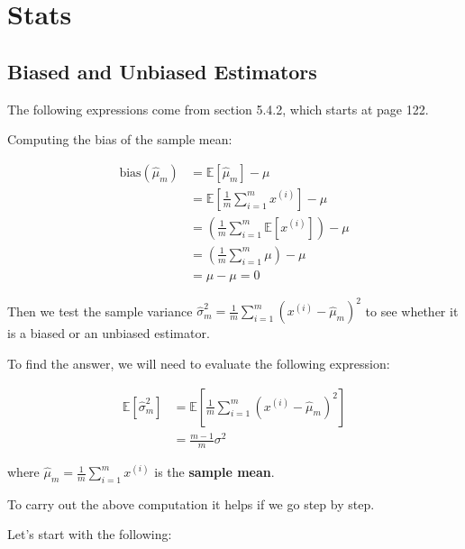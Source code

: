 \chapter{Stats}

\section{Biased and Unbiased Estimators}

The following expressions come from \cite{Goodfellow-et-al-2016} section 5.4.2, 
which starts at page 122.

Computing the bias of the sample mean:

\begin{align*}
\text{bias}(\hat{\mu}_m) &= \mathbb{E}\left[\hat{\mu}_m\right] - \mu \\
&= \mathbb{E} \left[ \frac{1}{m} \sum_{i=1}^{m} x^{(i)} \right] - \mu \\
&= \left( \frac{1}{m} \sum_{i=1}^{m} \mathbb{E}\left[ x^{(i)} \right] \right) - \mu\\
&= \left( \frac{1}{m} \sum_{i=1}^{m} \mu \right) - \mu \\
&= \mu - \mu = 0
\end{align*}

Then we test the sample variance
$\hat{\sigma}^{2}_{m} = \frac{1}{m} \sum_{i=1}^{m} \left( x^{(i)} - \hat{\mu}_m \right)^2$
to see whether it is a biased or an unbiased estimator.

To find the answer, we will need to evaluate the following expression:

\begin{align} \label{stats:biased-variance-estimator}
\mathbb{E}\left[ \hat{\sigma}^{2}_{m} \right] 
    &= \mathbb{E} \left[ \frac{1}{m} \sum_{i=1}^{m} \left( x^{(i)} - \hat{\mu}_m \right)^2 \right] \\
&= \frac{m-1}{m} \sigma^2
\end{align}

where $\hat{\mu}_m = \frac{1}{m} \sum_{i=1}^{m} x^{(i)}$ is the \textbf{sample mean}.
 


To carry out the above computation it helps if we go step by step.

Let's start with the following:

